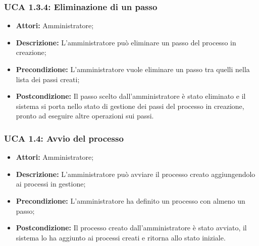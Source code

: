 \hypertarget{A1.3.4}{}
\subsubsection{UCA 1.3.4: Eliminazione di un passo}
\begin{itemize}
\item \textbf{Attori:}
Amministratore;
\item \textbf{Descrizione:}
L'amministratore può eliminare un passo del processo in creazione;
\item \textbf{Precondizione:}
L'amministratore vuole eliminare un passo tra quelli nella lista dei passi creati;
\item \textbf{Postcondizione:}
Il passo scelto dall'amministratore è stato eliminato e il sistema si porta nello stato di gestione dei passi del processo in creazione, pronto ad eseguire altre operazioni sui passi.
\end{itemize}

\hypertarget{A1.4}{}
\subsubsection{UCA 1.4: Avvio del processo}
\begin{itemize}
\item \textbf{Attori:}
Amministratore;
\item \textbf{Descrizione:}
L'amministratore può avviare il processo creato aggiungendolo ai processi in gestione;
\item \textbf{Precondizione:}
L'amministratore ha definito un processo con almeno un passo;
\item \textbf{Postcondizione:}
Il processo creato dall'amministratore è stato avviato, il sistema lo ha aggiunto ai processi creati e ritorna allo stato iniziale.
\end{itemize}

\hypertarget{A2}{}
